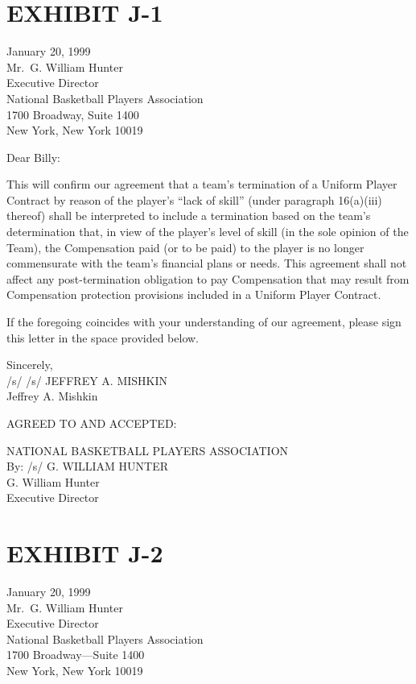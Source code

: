 \documentclass[
]{book}
\begin{document}
\hypertarget{exhibit-j-1}{%
\section{EXHIBIT J-1}\label{exhibit-j-1}}

January 20, 1999\\
Mr.~G. William Hunter\\
Executive Director\\
National Basketball Players Association\\
1700 Broadway, Suite 1400\\
New York, New York 10019

Dear Billy:

This will confirm our agreement that a team's termination of a Uniform Player Contract by reason of the player's ``lack of skill'' (under paragraph 16(a)(iii) thereof) shall be interpreted to include a termination based on the team's determination that, in view of the player's level of skill (in the sole opinion of the Team), the Compensation paid (or to be paid) to the player is no longer commensurate with the team's financial plans or needs. This agreement shall not affect any post-termination obligation to pay Compensation that may result from Compensation protection provisions included in a Uniform Player Contract.

If the foregoing coincides with your understanding of our agreement, please sign this letter in the space provided below.

Sincerely,\\
/s/ /s/ JEFFREY A. MISHKIN\\
Jeffrey A. Mishkin

AGREED TO AND ACCEPTED:

NATIONAL BASKETBALL PLAYERS ASSOCIATION\\
By: /s/ G. WILLIAM HUNTER\\
G. William Hunter\\
Executive Director

\hypertarget{exhibit-j-2}{%
\section{EXHIBIT J-2}\label{exhibit-j-2}}

January 20, 1999\\
Mr.~G. William Hunter\\
Executive Director\\
National Basketball Players Association\\
1700 Broadway---Suite 1400\\
New York, New York 10019
\end{document}

